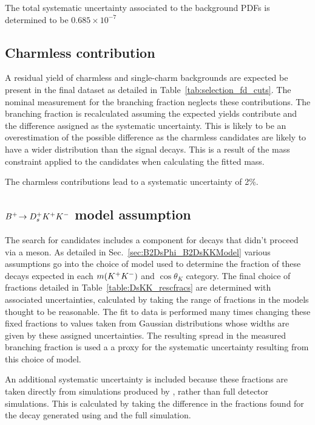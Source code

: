 The total systematic uncertainty associated to the background PDFs is determined to be $0.685\times 10^{-7}$

\subsection{Charmless contribution}
A residual yield of charmless and single-charm backgrounds are expected be present in the final dataset as detailed in Table~\ref{tab:selection_fd_cuts}. The nominal measurement for the branching fraction neglects these contributions. The branching fraction is recalculated assuming the expected yields contribute and the difference assigned as the systematic uncertainty. This is likely to be an overestimation of the possible difference as the charmless candidates are likely to have a wider distribution than the signal decays. This is a result of the \Dsp mass constraint applied to the candidates when calculating the fitted \Bp mass. 

The charmless contributions lead to a systematic uncertainty of 2\%.

\subsection{${{{B}^+}}\!\rightarrow {\ensuremath{{D}^+_{s}}}{\ensuremath{{K}^+}}{\ensuremath{{K}^-}}$ model assumption}
The search for \decay{\Bp}{\Dsp\phiz} candidates includes a component for \decay{\Bp}{\Dsp\Kp\Km} decays that didn't proceed via a \phiz meson. As detailed in Sec.~\ref{sec:B2DsPhi_B2DsKKModel} various assumptions go into the choice of \decay{\Bp}{\Dsp\Kp\Km} model used to determine the fraction of these decays expected in each $m({{K}^+}{{K}^-})$ and $\cos{\theta_{K}}$ category. The final choice of fractions detailed in Table~\ref{table:DsKK_rescfracs} are determined with associated uncertainties, calculated by taking the range of fractions in the models thought to be reasonable. The fit to data is performed many times changing these fixed fractions to values taken from Gaussian distributions whose widths are given by these assigned uncertainties. The resulting spread in the measured branching fraction is used a a proxy for the systematic uncertainty resulting from this choice of model. 

An additional systematic uncertainty is included because these fractions are taken directly from simulations produced by \laurapp, rather than full detector simulations. This is calculated by taking the difference in the fractions found for the \decay{\Bp}{\Dsp\phiz} decay generated using \laurapp and the full \lhcb simulation.  


